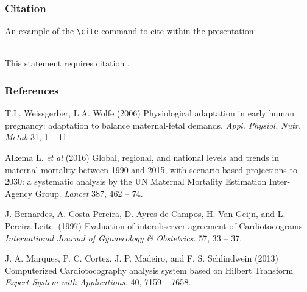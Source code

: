 \documentclass{beamer}
\begin{document}
\begin{frame}[fragile] %
\frametitle{Citation}
An example of the \verb|\cite| command to cite within the presentation:\\~

This statement requires citation \cite{p1}.
\end{frame}


\begin{frame}
\frametitle{References}
\footnotesize{
\begin{thebibliography}{99} %
 T.L. Weissgerber, L.A. Wolfe (2006)
\newblock Physiological adaptation in early human pregnancy: adaptation to balance maternal-fetal demands.
\newblock \emph{Appl. Physiol. Nutr. Metab} 31, 1 -- 11.

 Alkema L. {\em et al} (2016)
\newblock Global, regional, and national levels and trends in maternal mortality between 1990 and 2015, with scenario-based projections to 2030: a systematic analysis by the UN Maternal Mortality Estimation Inter-Agency Group.
\newblock \emph{Lancet} 387, 462 -- 74.

 J. Bernardes, A. Costa-Pereira, D. Ayres-de-Campos, H. Van Geijn, and L. Pereira-Leite. (1997)
\newblock Evaluation of interobserver agreement of Cardiotocograms
\newblock \emph{International Journal of Gynaecology \& Obstetrics.} 57, 33 -- 37.

 J. A. Marques, P. C. Cortez, J. P. Madeiro, and F. S. Schlindwein (2013)
\newblock Computerized Cardiotocography analysis system based on Hilbert Transform
\newblock \emph{Expert System with Applications.} 40, 7159 -- 7658.
\end{thebibliography}
}
\end{frame}

\end{document}
